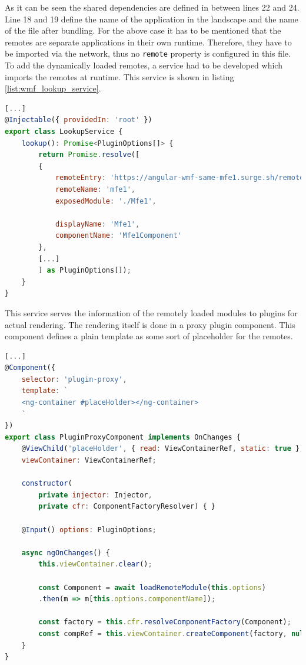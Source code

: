 As it can be seen the shared dependencies are defined in between lines 22 and 24. Line 18 and 19 define the name of the application in the landscape and the name of the file after bundling. For the above case it has to be mentioned that the remotes are separate applications in their own runtime. Therefore, they have to be imported via the network, thus no \texttt{remote} property is configured in this file. To add the dynamically loaded remotes, a service had to be developed which imports the remotes at runtime. This service is shown in listing \ref{list:wmf_lookup_service}.\cite{wmf_angular_dynamicfederation}

\begin{lstlisting}[language=JavaScript, caption=Content of \texttt{lookup.service.ts} for remote module loading in shell applications, label=list:wmf_lookup_service,  xleftmargin=.01\textwidth, xrightmargin=.01\textwidth]
[...]
@Injectable({ providedIn: 'root' })
export class LookupService {
	lookup(): Promise<PluginOptions[]> {
		return Promise.resolve([
		{
			remoteEntry: 'https://angular-wmf-same-mfe1.surge.sh/remoteEntry.js',
			remoteName: 'mfe1',
			exposedModule: './Mfe1',
			
			displayName: 'Mfe1',
			componentName: 'Mfe1Component'
		},
		[...]	
		] as PluginOptions[]);
	}
}
\end{lstlisting}

This service serves the information of the remotely loaded modules to plugins for actual rendering. The rendering itself is done in a proxy plugin component. This component defines a plain template as some sort of placeholder for the remotes. \cite{wmf_angular_dynamicfederation}
\newpage
\begin{lstlisting}[language=JavaScript, caption=Content of \texttt{plugin-proxy.component.ts} for remote module loading in shell applications, label=list:wmf_pluginproxy,  xleftmargin=.01\textwidth, xrightmargin=.01\textwidth]
[...]	
@Component({
	selector: 'plugin-proxy',
	template: `
	<ng-container #placeHolder></ng-container>
	`
})
export class PluginProxyComponent implements OnChanges {
	@ViewChild('placeHolder', { read: ViewContainerRef, static: true })
	viewContainer: ViewContainerRef;
	
	constructor(
		private injector: Injector,
		private cfr: ComponentFactoryResolver) { }
	
	@Input() options: PluginOptions;
	
	async ngOnChanges() {
		this.viewContainer.clear();
		
		const Component = await loadRemoteModule(this.options)
		.then(m => m[this.options.componentName]);
		
		const factory = this.cfr.resolveComponentFactory(Component);
		const compRef = this.viewContainer.createComponent(factory, null, this.injector);		
	}
}
\end{lstlisting}

